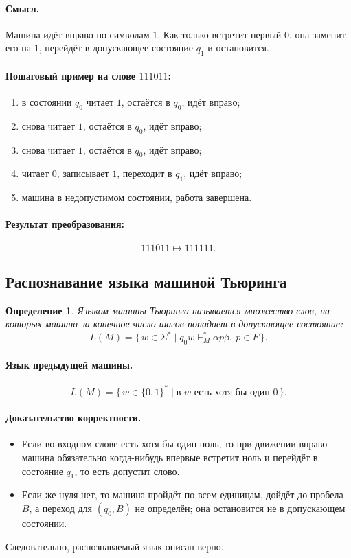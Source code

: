 \documentclass[12pt,a4paper]{article}
\newtheorem{definition}{Определение}
\begin{document}
\paragraph{Смысл.}
Машина идёт вправо по символам $1$. Как только встретит первый $0$, она заменит его на $1$, перейдёт в допускающее состояние $q_1$ и остановится.

\paragraph{Пошаговый пример на слове $111011$:}
\begin{enumerate}
    \item в состоянии $q_0$ читает $1$, остаётся в $q_0$, идёт вправо;
    \item снова читает $1$, остаётся в $q_0$, идёт вправо;
    \item снова читает $1$, остаётся в $q_0$, идёт вправо;
    \item читает $0$, записывает $1$, переходит в $q_1$, идёт вправо;
    \item машина в недопустимом состоянии, работа завершена.
\end{enumerate}

\paragraph{Результат преобразования:}
\[
111011 \mapsto 111111.
\]

\subsection{Распознавание языка машиной Тьюринга}
\begin{definition}
Языком машины Тьюринга называется множество слов, на которых машина за конечное число шагов попадает в допускающее состояние:
\[
L(M)=\{\,w\in\Sigma^* \mid q_0w \vdash_M^* \alpha p\beta,\ p\in F\,\}.
\]
\end{definition}

\paragraph{Язык предыдущей машины.}
\[
L(M)=\{\,w\in\{0,1\}^* \mid \text{в }w\text{ есть хотя бы один }0\,\}.
\]

\paragraph{Доказательство корректности.}
\begin{itemize}
    \item Если во входном слове есть хотя бы один ноль, то при движении вправо машина обязательно когда-нибудь впервые встретит ноль и перейдёт в состояние $q_1$, то есть допустит слово.
    \item Если же нуля нет, то машина пройдёт по всем единицам, дойдёт до пробела $B$, а переход для $(q_0,B)$ не определён; она остановится не в допускающем состоянии.
\end{itemize}
Следовательно, распознаваемый язык описан верно.
\end{document}
